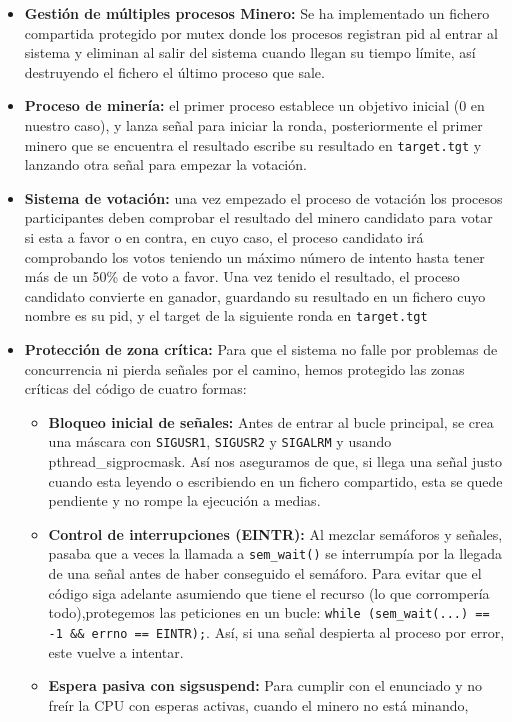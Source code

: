 \documentclass[11pt,a4paper]{article}
\begin{document}
\begin{itemize}
    \item \textbf{Gestión de múltiples procesos Minero:} Se ha implementado un fichero compartida protegido por mutex
    donde los procesos registran pid al entrar al sistema y eliminan al salir del sistema cuando llegan su tiempo límite, 
    así destruyendo el fichero el último proceso que sale.
    \item \textbf{Proceso de minería:} el primer proceso establece un objetivo inicial (0 en nuestro caso), y lanza señal para
    iniciar la ronda, posteriormente el primer minero que se encuentra el resultado escribe su resultado en \texttt{target.tgt}
    y lanzando otra señal para empezar la votación.
    \item \textbf{Sistema de votación:} una vez empezado el proceso de votación los procesos participantes deben comprobar el resultado del minero 
    candidato para votar si esta a favor o en contra, en cuyo caso, el proceso candidato irá comprobando los votos teniendo un máximo número de intento
    hasta tener más de un 50\% de voto a favor. Una vez tenido el resultado, el proceso candidato convierte en ganador, guardando su resultado en un
    fichero cuyo nombre es su pid, y el target de la siguiente ronda en \texttt{target.tgt}
    \item \textbf{Protección de zona crítica:} Para que el sistema no falle por problemas de concurrencia ni pierda señales por el camino, 
    hemos protegido las zonas críticas del código de cuatro formas:
    \begin{itemize}
    \item \textbf{Bloqueo inicial de señales:} Antes de entrar al bucle principal, se crea una máscara con \texttt{SIGUSR1}, \texttt{SIGUSR2} y \texttt{SIGALRM} 
    y usando pthread\_sigprocmask. Así nos aseguramos de que, si llega una señal justo cuando esta leyendo o escribiendo en un fichero compartido,
     esta se quede pendiente y no rompe la ejecución a medias.
    \item \textbf{Control de interrupciones (EINTR):} Al mezclar semáforos y señales, pasaba que a veces la llamada a \texttt{sem\_wait()} se interrumpía por la llegada de una 
    señal antes de haber conseguido el semáforo. Para evitar que el código siga adelante asumiendo que tiene el recurso (lo que corrompería todo),protegemos las peticiones en un bucle: 
    \texttt{while (sem\_wait(...) == -1 \&\& errno == EINTR);}.
    Así, si una señal despierta al proceso por error, este vuelve a intentar.
    \item \textbf{Espera pasiva con sigsuspend:} Para cumplir con el enunciado y no freír la CPU con esperas activas, cuando el minero no está minando, 

\end{itemize}
\end{itemize}
\end{document}

